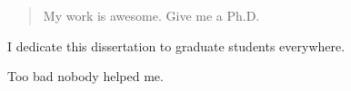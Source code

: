 \documentclass[12pt]{ucthesis}
\begin{document}

\maketitle
\copyrightpage

\begin{abstract}
My work is awesome. Give me a Ph.D.
\end{abstract}

\begin{frontmatter}
\renewcommand{\thepage}{\roman{page}}
\setcounter{page}{1}

\begin{dedication}
\null\vfil
{\large
\begin{center}
I dedicate this dissertation to graduate students everywhere.
\end{center}}
\null\vfil
\end{dedication}

\tableofcontents
\listoffigures %
\listoftables %


\begin{acknowledgements}
Too bad nobody helped me.
\end{acknowledgements}

\clearpage

\end{frontmatter}


\newpage
{}
{}
\end{document}
